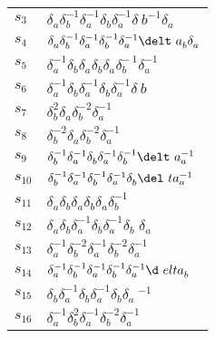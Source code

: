 \documentclass{article}
\begin{document}
\begin{center}
\begin{tabular}{ll}
$s_{3}$ & $\delta_a^{}\delta_b^{-1}\delta_a^{-1}\delta_b^{}\delta_a^{-1}\delta_\
b^{-1}\delta_a^{}$ \\
$s_{4}$ & $\delta_a^{}\delta_b^{-1}\delta_a^{-1}\delta_b^{-1}\delta_a^{-1}\delt\
a_b^{}\delta_a^{}$ \\
$s_{5}$ & $\delta_a^{-1}\delta_b^{}\delta_a^{}\delta_b^{}\delta_a^{}\delta_b^{-\
1}\delta_a^{-1}$ \\
$s_{6}$ & $\delta_a^{-1}\delta_b^{}\delta_a^{-1}\delta_b^{}\delta_a^{-1}\delta_\
b^{}$ \\
$s_{7}$ & $\delta_b^{2}\delta_a^{}\delta_b^{-2}\delta_a^{-1}$ \\
$s_{8}$ & $\delta_b^{-2}\delta_a^{}\delta_b^{-2}\delta_a^{-1}$ \\
$s_{9}$ & $\delta_b^{-1}\delta_a^{-1}\delta_b^{}\delta_a^{-1}\delta_b^{-1}\delt\
a_a^{-1}$ \\
$s_{10}$ & $\delta_b^{-1}\delta_a^{-1}\delta_b^{-1}\delta_a^{-1}\delta_b^{}\del\
ta_a^{-1}$ \\
$s_{11}$ & $\delta_a^{}\delta_b^{}\delta_a^{}\delta_b^{}\delta_a^{}\delta_b^{-1\
}$ \\
$s_{12}$ & $\delta_a^{}\delta_b^{}\delta_a^{-1}\delta_b^{}\delta_a^{-1}\delta_b\
^{}\delta_a^{}$ \\
$s_{13}$ & $\delta_a^{-1}\delta_b^{-2}\delta_a^{-1}\delta_b^{-2}\delta_a^{-1}$ 
\\
$s_{14}$ & $\delta_a^{-1}\delta_b^{-1}\delta_a^{-1}\delta_b^{-1}\delta_a^{-1}\d\
elta_b^{}$ \\
$s_{15}$ & $\delta_b^{}\delta_a^{-1}\delta_b^{}\delta_a^{-1}\delta_b^{}\delta_a\
^{-1}$ \\
$s_{16}$ & $\delta_a^{-1}\delta_b^{2}\delta_a^{-1}\delta_b^{-2}\delta_a^{-1}$ \\
\bottomrule
\end{tabular}
\end{center}

\thispagestyle{empty}
\end{document}
